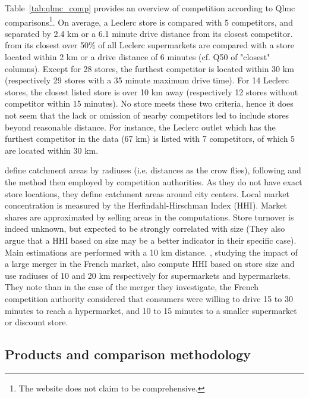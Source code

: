 \documentclass[english]{article}
\begin{document}
Table~\ref{tab:qlmc_comp} provides an overview of competition according to Qlmc comparisons\footnote{The website does not claim to be comprehensive.}. On average, a Leclerc store is compared with 5 competitors, and separated by 2.4 km or a 6.1 minute drive distance from its closest competitor. from its closest over 50\% of all Leclerc supermarkets are compared with a store located within 2 km or a drive distance of 6 minutes (cf. Q50 of "closest" columns). Except for 28 stores, the furthest competitor is located within 30 km (respectively 29 stores with a 35 minute maximum drive time). For 14 Leclerc stores, the closest listed store is over 10 km away (respectively 12 stores without competitor within 15 minutes). No store meets these two criteria, hence it does not seem that the lack or omission of nearby competitors led to include stores beyond reasonable distance. For instance, the Leclerc outlet which has the furthest competitor in the data (67 km) is listed with 7 competitors, of which 5 are located within 30 km.

\cite{BIS13} define catchment areas by radiuses (i.e. distances as the crow flies), following \cite{BAR06} and the method then employed by competition authorities. As they do not have exact store locations, they define catchment areas around city centers. Local market concentration is measured by the Herfindahl-Hirschman Index (HHI). Market shares are approximated by selling areas in the computations. Store turnover is indeed unknown, but expected to be strongly correlated with size (They also argue that a HHI based on size may be a better indicator in their specific case). Main estimations are performed with a 10 km distance. \cite{ALL16a}, studying the impact of a large merger in the French market, also compute HHI based on store size and use radiuses of 10 and 20 km respectively for supermarkets and hypermarkets. They note than in the case of the merger they investigate, the French competition authority considered that consumers were willing to drive 15 to 30 minutes to reach a hypermarket, and 10 to 15 minutes to a smaller supermarket or discount store.

\subsection{Products and comparison methodology}
\end{document}
